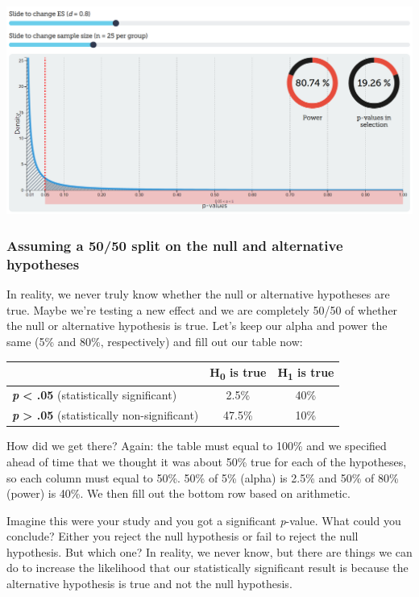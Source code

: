 \documentclass[
]{book}
\begin{document}
\includegraphics{images/05-bean/alternative.png}

\hypertarget{assuming-a-5050-split-on-the-null-and-alternative-hypotheses}{%
\subsubsection{Assuming a 50/50 split on the null and alternative hypotheses}\label{assuming-a-5050-split-on-the-null-and-alternative-hypotheses}}

In reality, we never truly know whether the null or alternative hypotheses are true. Maybe we're testing a new effect and we are completely 50/50 of whether the null or alternative hypothesis is true. Let's keep our alpha and power the same (5\% and 80\%, respectively) and fill out our table now:

\begin{longtable}[]{@{}lcc@{}}
\toprule
& H\textsubscript{0} is true & H\textsubscript{1} is true \\
\midrule
\endhead
\textbf{\emph{p}} \textbf{\textless{} .05} (statistically significant) & 2.5\% & 40\% \\
\textbf{\emph{p}} \textbf{\textgreater{} .05} (statistically non-significant) & 47.5\% & 10\% \\
\bottomrule
\end{longtable}

How did we get there? Again: the table must equal to 100\% and we specified ahead of time that we thought it was about 50\% true for each of the hypotheses, so each column must equal to 50\%. 50\% of 5\% (alpha) is 2.5\% and 50\% of 80\% (power) is 40\%. We then fill out the bottom row based on arithmetic.

Imagine this were your study and you got a significant \emph{p}-value. What could you conclude? Either you reject the null hypothesis or fail to reject the null hypothesis. But which one? In reality, we never know, but there are things we can do to increase the likelihood that our statistically significant result is because the alternative hypothesis is true and not the null hypothesis.
\end{document}
